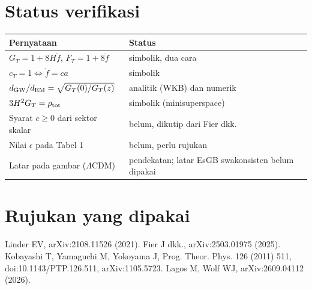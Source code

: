 \documentclass[11pt,a4paper]{article}
\begin{document}
\section{Status verifikasi}
\begin{tabular}{p{9.2cm}p{5.6cm}}\toprule
Pernyataan & Status\\\midrule
$G_T=1+8H\dot f$, $F_T=1+8\ddot f$ & simbolik, dua cara\\
$c_T=1\Leftrightarrow\dot f=ca$ & simbolik\\
$d_{\rm GW}/d_{\rm EM}=\sqrt{G_T(0)/G_T(z)}$ & analitik (WKB) dan numerik\\
$3H^2G_T=\rho_{\rm tot}$ & simbolik (minisuperspace)\\
Syarat $c\ge0$ dari sektor skalar & belum, dikutip dari Fier dkk.\\
Nilai $\epsilon$ pada Tabel 1 & belum, perlu rujukan\\
Latar pada gambar ($\Lambda$CDM) & pendekatan; latar EsGB swakonsisten belum dipakai\\\bottomrule
\end{tabular}

\section*{Rujukan yang dipakai}\raggedright
Linder EV, arXiv:2108.11526 (2021). Fier J dkk., arXiv:2503.01975 (2025). Kobayashi T, Yamaguchi M, Yokoyama J, Prog. Theor. Phys. 126 (2011) 511, doi:10.1143/PTP.126.511, arXiv:1105.5723. Lagos M, Wolf WJ, arXiv:2609.04112 (2026).
\end{document}
